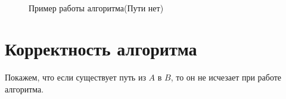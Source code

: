 \documentclass[12pt]{article}
\begin{document}
\begin{figure}[H]
\begin{minipage}[h]{0.3\linewidth}
	\end{minipage}
	\hfill
	\begin{minipage}[h]{0.3\linewidth}
		\\
	\end{minipage}
	\hfill
	\caption{Пример работы алгоритма(Пути нет)}
	\label{fig:ex_2}
\end{figure}

\section*{Корректность алгоритма}
Покажем, что если существует путь из $A$ в $B$, то он не исчезает при работе алгоритма.
\end{document}
